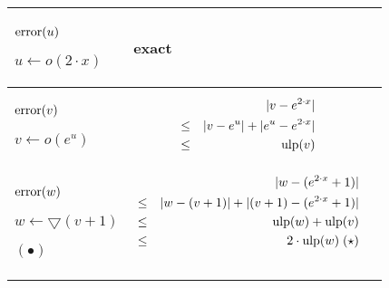 \documentclass[12pt]{amsart}
\def\minf{\bigtriangledown}
\def\ulp{{\rm ulp}}
\begin{document}
\begin{center}
\begin{tabular}{l|l |l}

\begin{minipage}{2.5cm}


${\textnormal{error}}(u)$


$u \leftarrow o(2 \cdot x)$


\end{minipage} &
\begin{minipage}{7.5cm}


exact

\end{minipage} &
\begin{minipage}{6cm}
{\hspace{7cm}}
\end{minipage}\\\hline
\begin{minipage}{2.5cm}
${\textnormal{error}}(v)$


$v \leftarrow o(e^{u}) $

\end{minipage} &
\begin{minipage}{7.5cm}



\begin{eqnarray}\nonumber
  &&|v-e^{2 \cdot x}| \\\nonumber
  &       \leq&  |v - e^{u}| +  |e^{u}  - e^{2 \cdot x}|\\\nonumber
  &       \leq& \ulp(v)
\end{eqnarray}


\end{minipage} &
\begin{minipage}{6cm}


\end{minipage}\\\hline
\begin{minipage}{2.5cm}
${\textnormal{error}}(w)$


$w \leftarrow \minf(v+1) $

$(\bullet)$
\end{minipage} &
\begin{minipage}{7.5cm}



\begin{eqnarray}\nonumber
  &&|w-(e^{2 \cdot x}+1)| \\\nonumber
  &\leq&  |w - (v+1)|+|(v+1) - (e^{2 \cdot x}+1)|\\\nonumber
  &\leq&  \ulp(w) + \ulp(v)\\\nonumber
  &\leq&  2 \cdot \ulp(w)\;(\star)\\\nonumber
\end{eqnarray}


\end{minipage}
\end{tabular}
\end{center}
\end{document}
